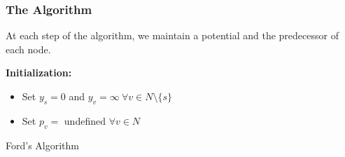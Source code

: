 \subsubsection{The Algorithm}
At each step of the algorithm, we maintain a potential and the predecessor of each node.

\IncMargin{1em}
\begin{algorithm}[H]\label{alg:ford}  
  \nl \textbf{Initialization:}
  \begin{itemize}
      \item Set $y_s = 0$ and $y_v = \infty\:\forall v \in N\setminus\{s\}$ 
      \item Set $p_v =$ undefined $\forall v \in N$
  \end{itemize}

  \nl {}

  \caption{Ford's Algorithm}
\end{algorithm}

